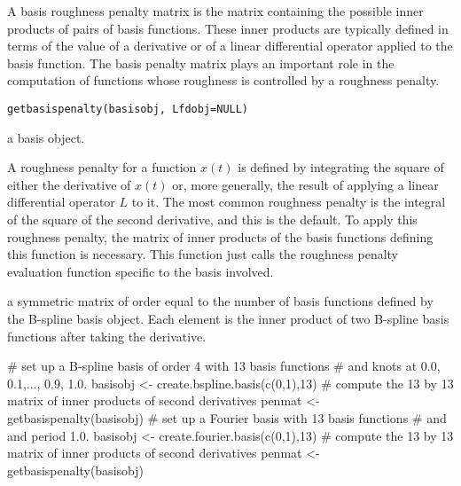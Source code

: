 \documentclass{article}
\begin{document}
\begin{Description}\relax
A basis roughness penalty matrix is the matrix containing
the possible inner products of pairs of basis functions.
These inner products are typically defined in terms of
the value of a derivative or of a linear differential
operator applied to the basis function.  The basis penalty
matrix plays an important role in the computation of
functions whose roughness is controlled by a roughness
penalty.
\end{Description}
\begin{Usage}
\begin{verbatim}
getbasispenalty(basisobj, Lfdobj=NULL)
\end{verbatim}
\end{Usage}
\begin{Arguments}
\begin{ldescription}
\item[\code{basisobj}] a basis object.

\item[\code{Lfdobj}] 
\end{ldescription}
\end{Arguments}
\begin{Details}\relax
A roughness penalty for a function $x(t)$ is defined by
integrating the square of either the derivative of  $ x(t) $ or,
more generally, the result of applying a linear differential operator
$L$ to it.  The most common roughness penalty is the integral of
the square of the second derivative, and
this is the default. To apply this roughness penalty, the matrix of
inner products of the basis functions defining this function is
necessary. This function just calls the roughness penalty evaluation
function specific to the basis involved.
\end{Details}
\begin{Value}
a symmetric matrix of order equal to the number of basis functions
defined by the B-spline basis object.  Each element is the inner product
of two B-spline basis functions after taking the derivative.
\end{Value}
\begin{SeeAlso}\relax
{}
\end{SeeAlso}
\begin{Examples}
\begin{ExampleCode}

#  set up a B-spline basis of order 4 with 13 basis functions
#  and knots at 0.0, 0.1,..., 0.9, 1.0.
basisobj <- create.bspline.basis(c(0,1),13)
#  compute the 13 by 13 matrix of inner products of second derivatives
penmat <- getbasispenalty(basisobj)
#  set up a Fourier basis with 13 basis functions
#  and and period 1.0.
basisobj <- create.fourier.basis(c(0,1),13)
#  compute the 13 by 13 matrix of inner products of second derivatives
penmat <- getbasispenalty(basisobj)

\end{ExampleCode}
\end{Examples}
\end{document}
